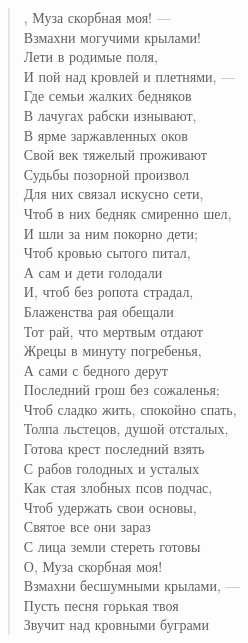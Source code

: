 \begin{verse}
\begin{patverse*}
, Муза скорбная моя! ---\\
Взмахни могучими крылами!\\
Лети в родимые поля,\\
И пой над кровлей и плетнями, ---\\
Где семьи жалких бедняков\\
В лачугах рабски изнывают,\\
В ярме заржавленных оков\\
Свой век тяжелый проживают\ldotse\\
Судьбы позорной произвол\\
Для них связал искусно сети,\\
Чтоб в них бедняк смиренно шел,\\
И шли за ним покорно дети;\\
Чтоб кровью сытого питал,\\
А сам и дети голодали\ldotst\\
И, чтоб без ропота страдал,\\
Блаженства рая обещали\ldotst\\
Тот рай, что мертвым отдают\\
Жрецы в минуту погребенья,\\
А сами с бедного дерут\\
Последний грош без сожаленья;\\
Чтоб сладко жить, спокойно спать,\\
Толпа льстецов, душой отсталых,\\
Готова крест последний взять\\
С рабов голодных и усталых\ldotst\\
Как стая злобных псов подчас,\\
Чтоб удержать свои основы,\\
Святое все они зараз\\
С лица земли стереть готовы\ldotst\\
О, Муза скорбная моя!\\
Взмахни бесшумными крылами, ---\\
Пусть песня горькая твоя\\
Звучит над кровными буграми\ldotse
\end{patverse*}
\end{verse}


